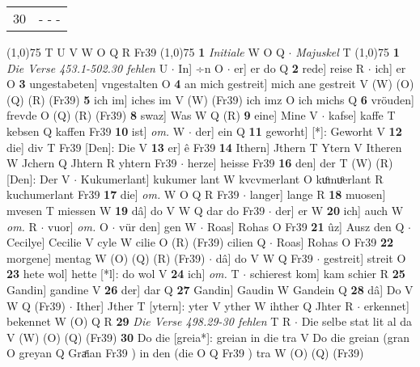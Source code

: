 \documentclass[8pt,a4paper,notitlepage]{article}
\begin{document}
\begin{table}[ht]
\begin{minipage}[t]{0.5\linewidth}
\begin{tabular}{rl}
30 & \multicolumn{1}{l}{ - - - }\\ 
\end{tabular}
\scriptsize
\line(1,0){75} \newline
T U V W O Q R Fr39 \newline
\line(1,0){75} \newline
\textbf{1} \textit{Initiale} W O Q   $\cdot$ \textit{Majuskel} T  \newline
\line(1,0){75} \newline
\textbf{1} \textit{Die Verse 453.1-502.30 fehlen} U   $\cdot$ In] ÷n O  $\cdot$ er] er do Q \textbf{2} rede] reise R  $\cdot$ ich] er O \textbf{3} ungestabeten] vngestalten O \textbf{4} an mich gestreit] mich ane gestreit V (W) (O) (Q) (R) (Fr39) \textbf{5} ich im] iches im V (W) (Fr39) ich imz O ich michs Q \textbf{6} vröuden] frevde O (Q) (R) (Fr39) \textbf{8} swaz] Was W Q (R) \textbf{9} eine] Mine V  $\cdot$ kafse] kaffe T kebsen Q kaffen Fr39 \textbf{10} ist] \textit{om.} W  $\cdot$ der] ein Q \textbf{11} geworht] [*]: Geworht V \textbf{12} die] div T Fr39 [Den]: Die V \textbf{13} er] ê Fr39 \textbf{14} Ithern] Jthern T Ytern V Itheren W Jchern Q Jhtern R yhtern Fr39  $\cdot$ herze] heisse Fr39 \textbf{16} den] der T (W) (R) [Den]: Der  V  $\cdot$ Kukumerlant] kukumer lant W kvcvmerlant O kuͦmuͦerlant R kuchumerlant Fr39 \textbf{17} die] \textit{om.} W O Q R Fr39  $\cdot$ langer] lange R \textbf{18} muosen] mvesen T miessen W \textbf{19} dâ] do V W Q dar do Fr39  $\cdot$ der] er W \textbf{20} ich] auch W \textit{om.} R  $\cdot$ vuor] \textit{om.} O  $\cdot$ vür den] gen W  $\cdot$ Roas] Rohas O Fr39 \textbf{21} ûz] Ausz den Q  $\cdot$ Cecilye] Cecilie V cyle W cilie O (R) (Fr39) cilien Q  $\cdot$ Roas] Rohas O Fr39 \textbf{22} morgene] mentag W (O) (Q) (R) (Fr39)  $\cdot$ dâ] do V W Q Fr39  $\cdot$ gestreit] streit O \textbf{23} hete wol] hette [*l]: do wol V \textbf{24} ich] \textit{om.} T  $\cdot$ schierest kom] kam schier R \textbf{25} Gandin] gandine V \textbf{26} der] dar Q \textbf{27} Gandin] Gaudin W Gandein Q \textbf{28} dâ] Do V W Q (Fr39)  $\cdot$ Ither] Jther T [ytern]: yter V yther W ihther Q Jhter R  $\cdot$ erkennet] bekennet W (O) Q R \textbf{29} \textit{Die Verse 498.29-30 fehlen} T R   $\cdot$ Die selbe stat lit al da V (W) (O) (Q) (Fr39) \textbf{30} Do die [greia*]: greian in die tra V Do die greian (gran O greyan Q Graͤian Fr39 ) in den (die O Q Fr39 ) tra W (O) (Q) (Fr39) \newline
\end{minipage}
\end{table}
\end{document}
